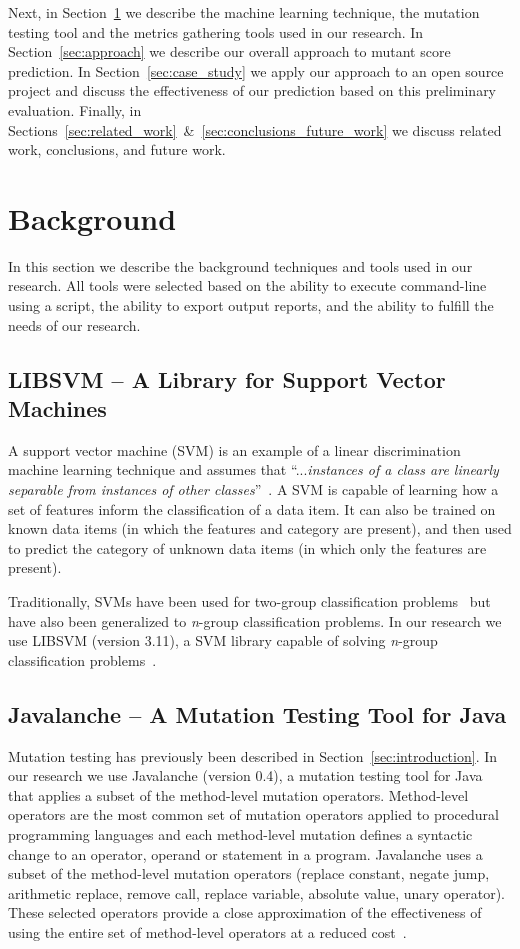 \documentclass[10pt,conference,compsocconf]{IEEEtran}
\begin{document}
Next, in Section~\ref{sec:background} we describe the machine learning technique, the mutation testing tool and the metrics gathering tools used in our research. In Section~\ref{sec:approach} we describe our overall approach to mutant score prediction. In Section~\ref{sec:case_study} we apply our approach to an open source project and discuss the effectiveness of our prediction based on this preliminary evaluation. Finally, in Sections~\ref{sec:related_work}~\&~\ref{sec:conclusions_future_work} we discuss related work, conclusions, and future work.


\section{Background}
\label{sec:background}
In this section we describe the background techniques and tools used in our research. All tools were selected based on the ability to execute command-line using a script, the ability to export output reports, and the ability to fulfill the needs of our research.


\subsection{LIBSVM -- A Library for Support Vector Machines}
\label{subsec:libsvm}
A support vector machine (SVM) is an example of a linear discrimination machine learning technique and assumes that ``...\emph{instances of a class are linearly separable from instances of other classes}''~\cite{ALP04}. A SVM is capable of learning how a set of features inform the classification of a data item. It can also be trained on known data items (in which the features and category are present), and then used to predict the category of  unknown data items (in which only the features are present).

Traditionally, SVMs have been used for two-group classification problems~\cite{CV95} but have also been generalized to \emph{n}-group classification problems. In our research we use LIBSVM (version 3.11), a SVM library capable of solving \emph{n}-group classification problems~\cite{CL11}.


\subsection{Javalanche -- A Mutation Testing Tool for Java}
\label{subsec:javalanche}
Mutation testing has previously been described in Section~\ref{sec:introduction}. In our research we use Javalanche (version 0.4), a mutation testing tool for Java~\cite{SZ09} that applies a subset of the method-level mutation operators. Method-level operators are the most common set of mutation operators applied to procedural programming languages and each method-level mutation defines a syntactic change to an operator, operand or statement in a program. Javalanche uses a subset of the method-level mutation operators (replace constant, negate jump, arithmetic replace, remove call, replace variable, absolute value, unary operator). These selected operators provide a close approximation of the effectiveness of using the entire set of method-level operators at a reduced cost~\cite{OLR+96}.
\end{document}
